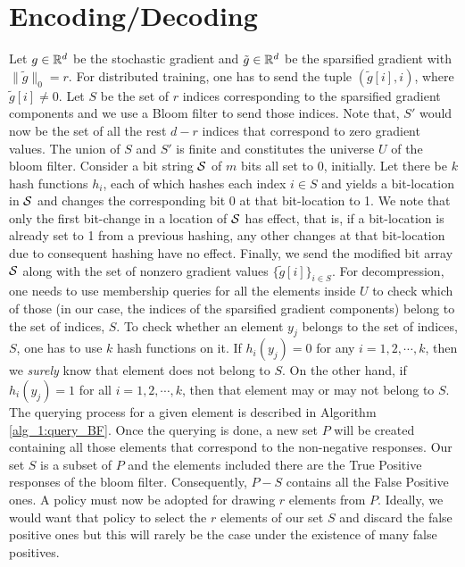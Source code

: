     \section{Encoding/Decoding}
        Let $g\in\mathbb{R}^d$ be the stochastic gradient and $\tilde{g}\in\mathbb{R}^d$ be the sparsified gradient with $\|\tilde{g}\|_0=r$. For distributed training, one has to send the tuple $(\tilde{g}[i],i)$, where $\tilde{g}[i]\neq 0$. Let $S$ be the set of $r$ indices corresponding to the sparsified gradient components  and we use a Bloom filter to send those indices. Note that, $S'$ would now be the set of all the rest $d-r$ indices that correspond to zero gradient values. The union of $S$ and $S'$ is finite and constitutes the universe $U$ of the bloom filter. Consider a bit string ${\cal S}$ of $m$ bits all set to 0, initially. Let there be $k$ hash functions $h_i$, each of which hashes each index $i\in S$ and yields a bit-location in ${\cal S}$ and changes the corresponding bit 0 at that bit-location to 1. We note that only the first bit-change in a location of ${\cal S}$ has effect, that is, if a bit-location is already set to 1 from a previous hashing, any other changes at that bit-location due to consequent hashing have no effect. Finally, we send the modified bit array ${\cal S}$ along with the set of nonzero gradient values $\{\tilde{g}[i]\}_{i\in S}$.
        For decompression, one needs to use membership queries for all the elements inside $U$ to check which of those (in our case, the indices of the sparsified gradient components) belong to the set of indices, $S$. To check whether an element $y_j$ belongs to the set of indices, $S$, one has to use $k$ hash functions on it. If $h_i(y_j)=0$ for any $i=1,2,\cdots,k$, then we {\em surely} know that element does not belong to $S$. On the other hand, if $h_i(y_j)=1$ for all $i=1,2,\cdots,k$, then that element may or may not belong to $S$. The querying process for a given element is described in Algorithm \ref{alg_1:query_BF}. Once the querying is done, a new set $P$ will be created containing all those elements that correspond to the non-negative responses. Our set $S$ is a subset of $P$ and the elements included there are the True Positive responses of the bloom filter. Consequently, $P-S$ contains all the False Positive ones. A policy must now be adopted for drawing $r$ elements from $P$. Ideally, we would want that policy to select the $r$ elements of our set $S$ and discard the false positive ones but this will rarely be the case under the existence of many false positives.
